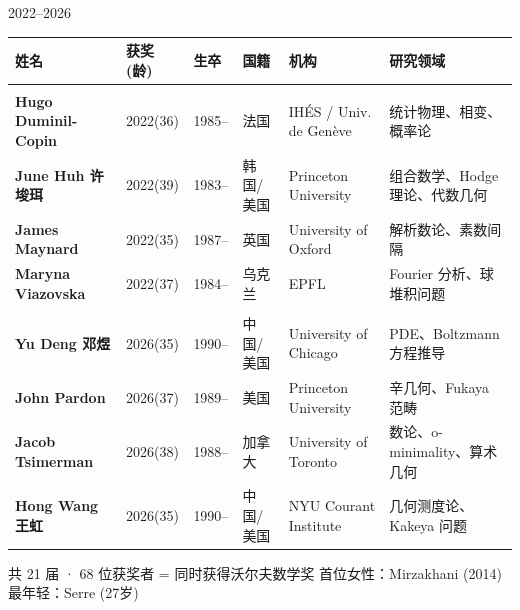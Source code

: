 \documentclass[aspectratio=169,9pt]{beamer}
\newcommand{\lrow}[6]{%
  {\bfseries\color{headerblue}#1} & {\color{yearcolor}#2} & {#3} & {#4} & {\scriptsize #5} & {\scriptsize\color{fieldcolor}#6} \\[1.5pt]
}
\newcommand{\congressrow}[2]{%
  \rowcolor{headerbg}
  \multicolumn{6}{l}{\raisebox{0pt}[1.1em][0.3em]{\bfseries\color{yearcolor}\normalsize #1 \color{mutedgray}\small\enspace #2}} \\[0.5pt]
}
\begin{document}
\begin{frame}{2022–2026}
\vspace{-2pt}
\centering
\scriptsize
\begin{tabular}{@{}
  >{\raggedright}m{2.3cm}
  >{\centering}m{0.9cm}
  >{\centering}m{1.2cm}
  >{\raggedright}m{1.3cm}
  >{\raggedright}m{2.7cm}
  >{\raggedright\arraybackslash}m{3.1cm}
@{}}
\toprule
\rowcolor{headerbg}
\textbf{姓名} & \textbf{获奖(龄)} & \textbf{生卒} & \textbf{国籍} & \textbf{机构} & \textbf{研究领域} \\
\midrule
\congressrow{2022}{赫尔辛基 Helsinki}
\lrow{Hugo Duminil-Copin}{2022(36)}{1985–}{法国}{IHÉS / Univ. de Genève}{统计物理、相变、概率论}
\lrow{June Huh 许埈珥}{2022(39)}{1983–}{韩国/美国}{Princeton University}{组合数学、Hodge 理论、代数几何}
\lrow{James Maynard}{2022(35)}{1987–}{英国}{University of Oxford}{解析数论、素数间隔}
\lrow{Maryna Viazovska}{2022(37)}{1984–}{乌克兰}{EPFL}{Fourier 分析、球堆积问题}
\congressrow{2026}{费城 Philadelphia}
\lrow{Yu Deng 邓煜}{2026(35)}{1990–}{中国/美国}{University of Chicago}{PDE、Boltzmann 方程推导}
\lrow{John Pardon}{2026(37)}{1989–}{美国}{Princeton University}{辛几何、Fukaya 范畴}
\lrow{Jacob Tsimerman}{2026(38)}{1988–}{加拿大}{University of Toronto}{数论、o-minimality、算术几何}
\lrow{Hong Wang 王虹}{2026(35)}{1990–}{中国/美国}{NYU Courant Institute}{几何测度论、Kakeya 问题}
\bottomrule
\end{tabular}

\vspace{8pt}
{\footnotesize\color{mutedgray} 共 21 届 · 68 位获奖者  = 同时获得沃尔夫数学奖 \quad 首位女性：Mirzakhani (2014) \quad 最年轻：Serre (27岁)}
\end{frame}
\end{document}
